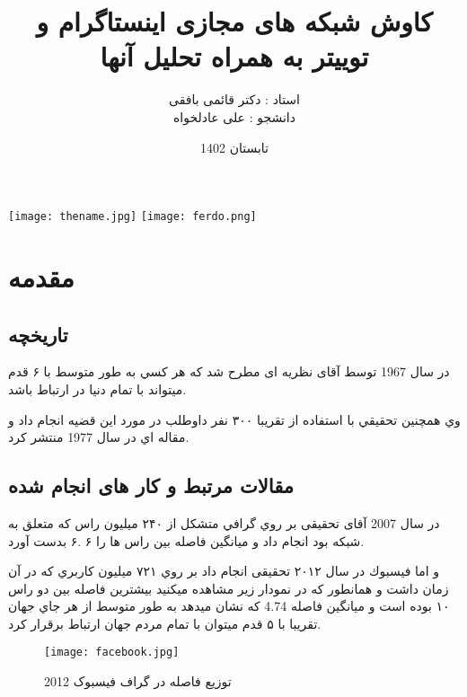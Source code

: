 \documentclass[12pt]{article}
\title{کاوش شبکه های مجازی اینستاگرام و توییتر به همراه تحلیل آنها }
\author{
استاد : دکتر قائمی بافقی
\\
دانشجو : علی عادلخواه
}
\date{تابستان 1402}
\begin{document}
\begin{center}
\texttt{[image: thename.jpg]}
\newpage
\texttt{[image: ferdo.png]}
\end{center}
\newpage

\tableofcontents

\newpage

\listoffigures

\newpage


\maketitle


\section{مقدمه}
\subsection{تاریخچه}
در سال 1967 توسط آقای
 نظریه ای مطرح شد كه هر كسي به طور متوسط با ۶ قدم ميتواند با تمام دنيا در ارتباط باشد.
\cite{smallworld}

وي همچنين تحقيقي با استفاده از تقريبا ۳۰۰ نفر داوطلب در مورد اين قضيه انجام داد و مقاله اي در سال 
1977 منتشر كرد.
\cite{swp}


\subsection{مقالات مرتبط و کار های انجام شده}
در سال 
2007
آقای 
  تحقیقی بر روي گرافي متشكل از ۲۴۰ ميليون راس كه متعلق به شبکه
    بود انجام داد و ميانگين فاصله بين راس ها را ۶ .۶ بدست آورد.
\cite{msn}


و اما فيسبوك در سال ۲۰۱۲ تحقيقی انجام داد بر روي ۷۲۱ ميليون كاربري كه در آن زمان داشت و 
همانطور كه در نمودار زير مشاهده ميكنيد بيشترين فاصله بين دو راس ۱۰ بوده است و ميانگين فاصله 4.74
كه نشان ميدهد به طور متوسط از هر جاي جهان تقريبا با ۵ قدم ميتوان با تمام مردم جهان ارتباط برقرار 
كرد.
\cite{fourdeg}

\begin{figure}[htbp]
\centering
\texttt{[image: facebook.jpg]}
\caption{توزیع فاصله در گراف فیسبوک 2012}
\end{figure}
\end{document}
